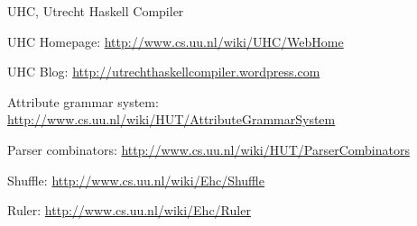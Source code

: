\begin{hcarentry}{UHC, Utrecht Haskell Compiler}
\FurtherReading
\begin{compactitem}
\item UHC Homepage:
\url{http://www.cs.uu.nl/wiki/UHC/WebHome}

\item UHC Blog:
\url{http://utrechthaskellcompiler.wordpress.com}

\item Attribute grammar system:
\url{http://www.cs.uu.nl/wiki/HUT/AttributeGrammarSystem}

\item Parser combinators:
\url{http://www.cs.uu.nl/wiki/HUT/ParserCombinators}

\item Shuffle:
\url{http://www.cs.uu.nl/wiki/Ehc/Shuffle}

\item Ruler:
\url{http://www.cs.uu.nl/wiki/Ehc/Ruler}
\end{compactitem}
\end{hcarentry}
